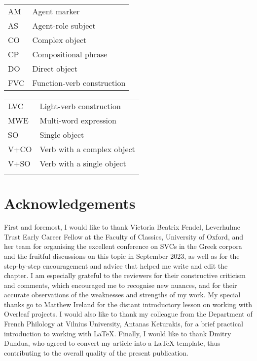 \documentclass[output=paper,colorlinks,citecolor=brown]{langscibook}
\begin{document}
\begin{tabularx}{.5\textwidth}{@{}lQ@{}}
    AM & Agent marker \\
    AS & Agent-role subject \\
    CO & Complex object \\
    CP & Compositional phrase \\
    DO & Direct object  \\
    FVC & Function-verb construction \\
\end{tabularx}%
\begin{tabularx}{.5\textwidth}{@{}lQ@{}}
    LVC & Light-verb construction \\
    MWE & Multi-word expression \\
    SO & Single object \\
    V+CO & Verb with a complex object \\
    V+SO & Verb with a single object \\
    \\
\end{tabularx}

\section*{Acknowledgements}

First and foremost, I would like to thank Victoria Beatrix Fendel, Leverhulme Trust Early Career Fellow at the Faculty of Classics, University of Oxford, and her team for organising the excellent conference on SVCs in the Greek corpora and the fruitful discussions on this topic in September 2023, as well as for the step-by-step encouragement and advice that helped me write and edit the chapter. I am especially grateful to the reviewers for their constructive criticism and comments, which encouraged me to recognise new nuances, and for their accurate observations of the weaknesses and strengths of my work. My special thanks go to Matthew Ireland for the distant introductory lesson on working with Overleaf projects. I would also like to thank my colleague from the Department of French Philology at Vilnius University, Antanas Keturakis, for a brief practical introduction to working with LaTeX. Finally, I would like to thank Dmitry Dundua, who agreed to convert my article into a LaTeX template, thus contributing to the overall quality of the present publication.


\sloppy
\printbibliography[heading=subbibliography,notkeyword=this]
\end{document}
